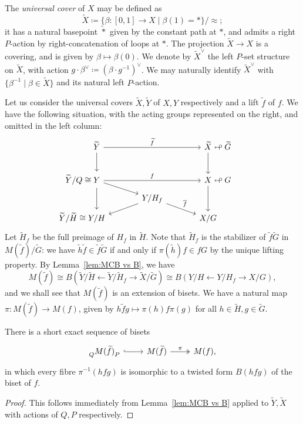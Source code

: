 \documentclass{amsart}
\newcommand\wtf{{\widetilde f}}
\newcommand\wtG{{\widetilde G}}
\newcommand\wtH{{\widetilde H}}
\begin{document}
The \emph{universal cover} of $X$ may be defined as
\[\widetilde X\coloneqq\{\beta\colon[0,1]\to X\mid\beta(1)=*\}/{\approx};
\]
it has a natural basepoint $\widetilde *$ given by the constant path
at $*$, and admits a right $P$-action by right-concatenation of loops
at $*$. The projection $\widetilde X\to X$ is a covering, and is given
by $\beta\mapsto\beta(0)$. We denote by $\widetilde X^\vee$ the left
$P$-set structure on $\widetilde X$, with action
$g\cdot\beta^\vee\coloneqq(\beta\cdot g^{-1})^\vee$.  We may naturally
identify $\widetilde X^\vee$ with
$\{\beta^{-1}\mid\beta\in\widetilde X\}$ and its natural left
$P$-action.

Let us consider the universal covers $\widetilde X,\widetilde Y$ of
$X,Y$ respectively and a lift $\wtf$ of $f$. We have the
following situation, with the acting groups represented on the right,
and omitted in the left column:
\[\begin{tikzcd}[column sep=large,row sep=tiny]
    \widetilde Y\ar[rr,"\wtf"]\ar[dd] & & \widetilde X\makebox[0mm][l]{${}\looparrowleft\wtG$}\ar[dd]\\
    &\phantom{Z}\\
    \makebox[0mm][r]{$\widetilde Y/Q\cong{}$}Y\ar[rr,"f"]\ar[dd]\ar[dr] & & X\makebox[0mm][l]{${}\looparrowleft G$}\ar[dd]\\
    & Y/H_f\ar[dl]\ar[dr,"\overline f"]\\
    \makebox[0mm][r]{$\widetilde Y/\wtH\cong{}$}Y/H & & X/G
  \end{tikzcd}
\]
Let $\wtH_f$ be the full preimage of $H_f$ in $\wtH$. Note that
$\wtH_f$ is the stabilizer of $\wtf\wtG$ in $M(\wtf)/\wtG$: we have
$\widetilde h\wtf \in \wtf \wtG$ if and only if
$\pi(\widetilde h)f \in f G$ by the unique lifting property. By
Lemma~\ref{lem:MCB vs B}, we have
\[M(\wtf)\cong B(\widetilde Y/\wtH\leftarrow\widetilde Y/\wtH_f\to\widetilde X/\wtG)\cong B(Y/H\leftarrow Y/H_f\to X/G),
\]
and we shall see that $M(\wtf)$ is an extension of bisets.  We
have a natural map $\pi\colon M(\wtf)\to M(f)$, given by
$h\wtf g\mapsto\pi(h)f\pi(g)$ for all
$h\in\wtH,g\in\wtG$.
\begin{lem}
  There is a short exact sequence of bisets
  \begin{equation}\label{eq:biset-ses}
    \begin{tikzcd}\subscript Q{M(\wtf)}_P\ar[r,hookrightarrow] & M(\wtf)\ar[r,twoheadrightarrow,"\pi"] & M(f),\end{tikzcd}
  \end{equation}
  in which every fibre $\pi^{-1}(h f g)$ is isomorphic to a twisted
  form $B(h f g)$ of the biset of $f$.
\end{lem}
\begin{proof}
  This follows immediately from Lemma~\ref{lem:MCB vs B} applied to
  $\widetilde Y,\widetilde X$ with actions of $Q,P$ respectively.
\end{proof}
\end{document}
